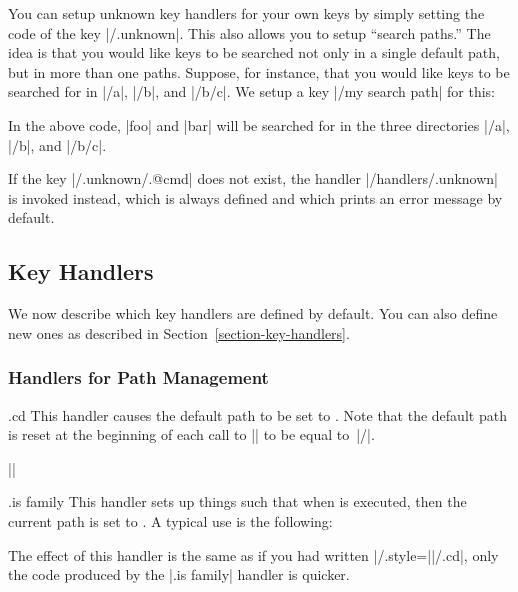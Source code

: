 You can setup unknown key handlers for your own keys by simply setting
the code of the key |/.unknown|. This also allows
you to setup ``search paths.'' The idea is that you would like keys to
be searched not only in a single default path, but in more than one
paths. Suppose, for instance, that you would like keys to be searched
for in |/a|, |/b|, and |/b/c|. We setup a key |/my search path| for
this:
\begin{codeexample}
\end{codeexample}
In the above code, |foo| and |bar| will be searched for in the three
directories  |/a|, |/b|, and |/b/c|. 

If the key |/.unknown/.@cmd| does not exist, the
handler |/handlers/.unknown| is invoked instead, which is always
defined and which prints an error message by default.

\subsection{Key Handlers}

We now describe which key handlers are defined by default. You can
also define new ones as described in Section~\ref{section-key-handlers}.


\subsubsection{Handlers for Path Management}

\begin{handler}{{.cd}}
  This handler causes the default path to be set to . Note that
  the default path is reset at the beginning of each call to
  |\pgfkeys| to be equal to~|/|.

  \example ||
\end{handler}

\begin{handler}{{.is family}}
  This handler sets up things such that when  is executed, then
  the current path is set to . A typical use is the following:
\begin{codeexample}
\end{codeexample}
  The effect of this handler is the same as if you had written
  |/.style=||/.cd|, only the code produced by the
  |.is family| handler is quicker.
\end{handler}


